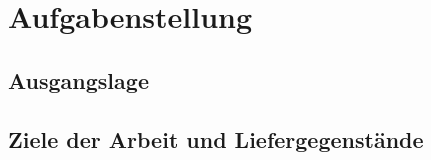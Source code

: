 
\thispagestyle{empty}
\section*{Aufgabenstellung}


\subsection*{Ausgangslage}
\subsection*{Ziele der Arbeit und Liefergegenstände}\label{subsec:ziele}
